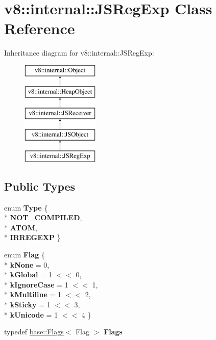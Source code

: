 \hypertarget{classv8_1_1internal_1_1_j_s_reg_exp}{}\section{v8\+:\+:internal\+:\+:J\+S\+Reg\+Exp Class Reference}
\label{classv8_1_1internal_1_1_j_s_reg_exp}
Inheritance diagram for v8\+:\+:internal\+:\+:J\+S\+Reg\+Exp\+:\begin{figure}[H]
\begin{center}
\leavevmode
\includegraphics[height=5.000000cm]{classv8_1_1internal_1_1_j_s_reg_exp}
\end{center}
\end{figure}
\subsection*{Public Types}
\begin{DoxyCompactItemize}
\item 
enum {\bfseries Type} \{ \\*
{\bfseries N\+O\+T\+\_\+\+C\+O\+M\+P\+I\+L\+ED}, 
\\*
{\bfseries A\+T\+OM}, 
\\*
{\bfseries I\+R\+R\+E\+G\+E\+XP}
 \}\hypertarget{classv8_1_1internal_1_1_j_s_reg_exp_a4f505066a55b1fa40937655595e04152}{}\label{classv8_1_1internal_1_1_j_s_reg_exp_a4f505066a55b1fa40937655595e04152}

\item 
enum {\bfseries Flag} \{ \\*
{\bfseries k\+None} = 0, 
\\*
{\bfseries k\+Global} = 1 $<$$<$ 0, 
\\*
{\bfseries k\+Ignore\+Case} = 1 $<$$<$ 1, 
\\*
{\bfseries k\+Multiline} = 1 $<$$<$ 2, 
\\*
{\bfseries k\+Sticky} = 1 $<$$<$ 3, 
\\*
{\bfseries k\+Unicode} = 1 $<$$<$ 4
 \}\hypertarget{classv8_1_1internal_1_1_j_s_reg_exp_a3fe304d5d9269091f2a4f33eee1af177}{}\label{classv8_1_1internal_1_1_j_s_reg_exp_a3fe304d5d9269091f2a4f33eee1af177}

\item 
typedef \hyperlink{classv8_1_1base_1_1_flags}{base\+::\+Flags}$<$ Flag $>$ {\bfseries Flags}\hypertarget{classv8_1_1internal_1_1_j_s_reg_exp_a2502565faa9ee5c3861105fd7e1915e2}{}\label{classv8_1_1internal_1_1_j_s_reg_exp_a2502565faa9ee5c3861105fd7e1915e2}

\end{DoxyCompactItemize}
